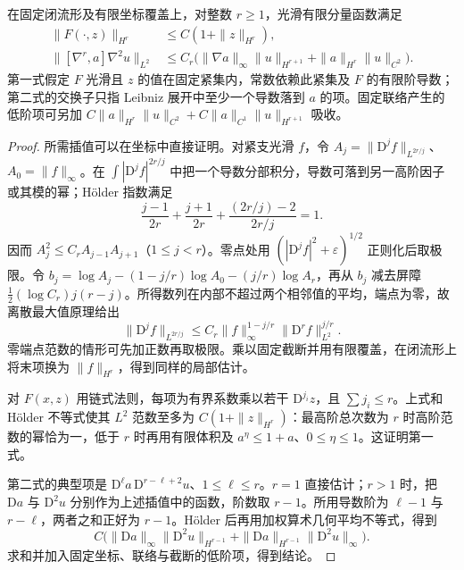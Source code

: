 \begin{lemma}\label{g3:lem:parabolic-tame-products}
	在固定闭流形及有限坐标覆盖上，对整数 \(r\ge1\)，光滑有限分量函数满足
	\begin{align*}
		\|F(\cdot,z)\|_{H^r}&\le C(1+\|z\|_{H^r}),\\
		\|[\nabla^r,a]\nabla^2u\|_{L^2}
		&\le C_r\bigl(\|\nabla a\|_\infty\|u\|_{H^{r+1}}
		+\|a\|_{H^r}\|u\|_{C^2}\bigr).
	\end{align*}
	第一式假定 \(F\) 光滑且 \(z\) 的值在固定紧集内，常数依赖此紧集及 \(F\) 的有限阶导数；第二式的交换子只指 Leibniz 展开中至少一个导数落到 \(a\) 的项。固定联络产生的低阶项可另加 \(C\|a\|_{H^r}\|u\|_{C^2}+C\|a\|_{C^1}\|u\|_{H^{r+1}}\) 吸收。
\end{lemma}
\begin{proof}
	所需插值可以在坐标中直接证明。对紧支光滑 \(f\)，令 \(A_j=\|\mathrm D^jf\|_{L^{2r/j}}\)、\(A_0=\|f\|_\infty\)。在 \(\int|\mathrm D^jf|^{2r/j}\) 中把一个导数分部积分，导数可落到另一高阶因子或其模的幂；Hölder 指数满足
	\[
		\frac{j-1}{2r}+\frac{j+1}{2r}
		+\frac{(2r/j)-2}{2r/j}=1.
	\]
	因而 \(A_j^2\le C_rA_{j-1}A_{j+1}\)（\(1\le j<r\)）。零点处用 \((|\mathrm D^jf|^2+\varepsilon)^{1/2}\) 正则化后取极限。令 \(b_j=\log A_j-(1-j/r)\log A_0-(j/r)\log A_r\)，再从 \(b_j\) 减去屏障 \(\tfrac12(\log C_r)j(r-j)\)。所得数列在内部不超过两个相邻值的平均，端点为零，故离散最大值原理给出
	\[
		\|\mathrm D^jf\|_{L^{2r/j}}
		\le C_r\|f\|_\infty^{1-j/r}\|\mathrm D^rf\|_{L^2}^{j/r}.
	\]
	零端点范数的情形可先加正数再取极限。乘以固定截断并用有限覆盖，在闭流形上将末项换为 \(\|f\|_{H^r}\)，得到同样的局部估计。

	对 \(F(x,z)\) 用链式法则，每项为有界系数乘以若干 \(\mathrm D^{j_i}z\)，且 \(\sum j_i\le r\)。上式和 Hölder 不等式使其 \(L^2\) 范数至多为 \(C(1+\|z\|_{H^r})\)：最高阶总次数为 \(r\) 时高阶范数的幂恰为一，低于 \(r\) 时再用有限体积及 \(a^\eta\le1+a\)、\(0\le\eta\le1\)。这证明第一式。

	第二式的典型项是 \(\mathrm D^\ell a\,\mathrm D^{r-\ell+2}u\)、\(1\le\ell\le r\)。\(r=1\) 直接估计；\(r>1\) 时，把 \(\mathrm Da\) 与 \(\mathrm D^2u\) 分别作为上述插值中的函数，阶数取 \(r-1\)。所用导数阶为 \(\ell-1\) 与 \(r-\ell\)，两者之和正好为 \(r-1\)。Hölder 后再用加权算术几何平均不等式，得到
	\[
		C\bigl(\|\mathrm Da\|_\infty\|\mathrm D^2u\|_{H^{r-1}}
		+\|\mathrm Da\|_{H^{r-1}}\|\mathrm D^2u\|_\infty\bigr).
	\]
	求和并加入固定坐标、联络与截断的低阶项，得到结论。
\end{proof}

